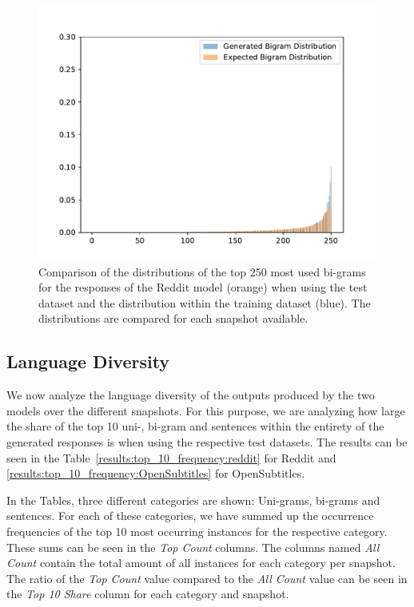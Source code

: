 \begin{figure}[H]
	\centering
	\small
	\endminipage\hfill
	\includegraphics[width=\linewidth]{img/plots/reddit/bigram_distribution_comparison_step_3000000.pdf}
	\centering
	\small
	\endminipage\hfill
	\caption{Comparison of the distributions of the top 250 most used bi-grams for the responses of the Reddit model (orange) when using the test dataset and the distribution within the training dataset (blue). The distributions are compared for each snapshot available.}
	\label{results:bigram:distributions:reddit}
\end{figure}

\subsection{Language Diversity}
We now analyze the language diversity of the outputs produced by the two models over the different snapshots. For this purpose, we are analyzing how large the share of the top 10 uni-, bi-gram and sentences within the entirety of the generated responses is when using the respective test datasets. The results can be seen in the Table~\ref{results:top_10_frequency:reddit} for Reddit and \ref{results:top_10_frequency:OpenSubtitles} for OpenSubtitles. 

In the Tables, three different categories are shown: Uni-grams, bi-grams and sentences. For each of these categories, we have summed up the occurrence frequencies of the top 10 most occurring instances for the respective category. These sums can be seen in the \emph{Top Count} columns. The columns named \emph{All Count} contain the total amount of all instances for each category per snapshot. The ratio of the \emph{Top Count} value compared to the \emph{All Count} value can be seen in the \emph{Top 10 Share} column for each category and snapshot.

